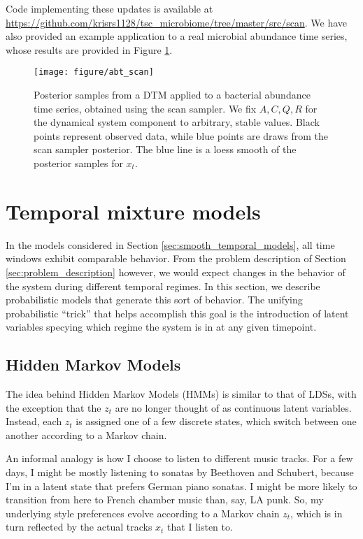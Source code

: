 \documentclass[14pt]{extarticle}
\begin{document}
Code implementing these updates is available at
\url{https://github.com/krisrs1128/tsc_microbiome/tree/master/src/scan}. We have
also provided an example application to a real microbial abundance time series,
whose results are provided in Figure \ref{fig:abt_scan}.

\begin{figure}
  \centering
  \texttt{[image: figure/abt\_scan]}
  \caption{Posterior samples from a DTM applied to a bacterial abundance time
    series, obtained using the scan sampler. We fix $A, C, Q, R$ for the
    dynamical system component to arbitrary, stable values. Black points
    represent observed data, while blue points are draws from the scan sampler
    posterior. The blue line is a loess smooth of the posterior samples for
    $x_t$.
    \label{fig:abt_scan}}
\end{figure}

\section{Temporal mixture models}
\label{sec:temporal_mixture_models}

In the models considered in Section \ref{sec:smooth_temporal_models}, all
time windows exhibit comparable behavior. From the problem description of
Section \ref{sec:problem_description} however, we would expect changes in the
behavior of the system during different temporal regimes. In this section, we
describe probabilistic models that generate this sort of behavior. The unifying
probabilistic ``trick'' that helps accomplish this goal is the introduction of
latent variables specying which regime the system is in at any given timepoint.

\subsection{Hidden Markov Models}
\label{subsec:hmms}

The idea behind Hidden Markov Models (HMMs) is similar to that of LDSs, with the
exception that the $z_{t}$ are no longer thought of as continuous latent
variables. Instead, each $z_{t}$ is assigned one of a few discrete states,
which switch between one another according to a Markov chain.

An informal analogy is how I choose to listen to different music tracks. For a
few days, I might be mostly listening to sonatas by Beethoven and Schubert,
because I'm in a latent state that prefers German piano sonatas. I might be more
likely to transition from here to French chamber music than, say, LA punk. So,
my underlying style preferences evolve according to a Markov chain $z_{t}$,
which is in turn reflected by the actual tracks $x_{t}$ that I listen to.
\end{document}

